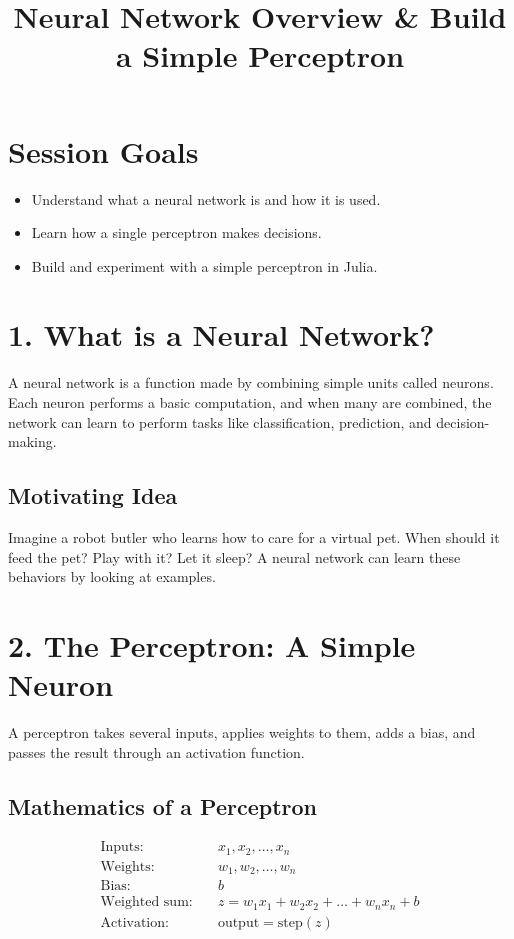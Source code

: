 \documentclass{book}
\title{Neural Network Overview \& Build a Simple Perceptron}
\begin{document}
\maketitle

\section*{Session Goals}
\begin{itemize}
  \item Understand what a neural network is and how it is used.
  \item Learn how a single perceptron makes decisions.
  \item Build and experiment with a simple perceptron in Julia.
\end{itemize}

\section*{1. What is a Neural Network?}
A neural network is a function made by combining simple units called neurons. Each neuron performs a basic computation, and when many are combined, the network can learn to perform tasks like classification, prediction, and decision-making.

\subsection*{Motivating Idea}
Imagine a robot butler who learns how to care for a virtual pet. When should it feed the pet? Play with it? Let it sleep? A neural network can learn these behaviors by looking at examples.

\section*{2. The Perceptron: A Simple Neuron}
A perceptron takes several inputs, applies weights to them, adds a bias, and passes the result through an activation function.

\subsection*{Mathematics of a Perceptron}
\begin{align*}
  \text{Inputs:} & \quad x_1, x_2, \ldots, x_n \\
  \text{Weights:} & \quad w_1, w_2, \ldots, w_n \\
  \text{Bias:} & \quad b \\
  \text{Weighted sum:} & \quad z = w_1 x_1 + w_2 x_2 + \ldots + w_n x_n + b \\
  \text{Activation:} & \quad \text{output} = \text{step}(z)
\end{align*}
\end{document}
